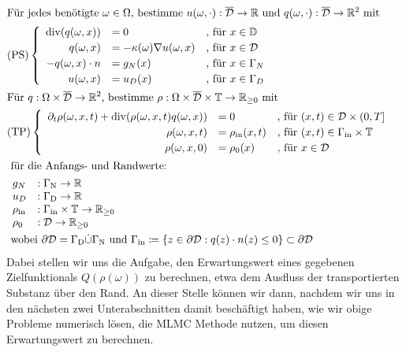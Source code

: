 \begin{align*}
\setlength\arraycolsep{1pt}
&\text{Für jedes benötigte } \omega \in \Omega \text{, bestimme } u(\omega,\cdot):\overline{\mathcal{D}} \to \R \text{ und } q(\omega, \cdot): \overline{\mathcal{D}} \to \R^2 \text{ mit } \\
&\text{(PS)}
	\begin{cases}
		\begin{array}{rlll}
		\dive (q(\omega,x)) &= 0  &\text{, für } x \in \mathbb{ D}\\  
		q(\omega,x) &= - \kappa(\omega) \nabla u(\omega,x)  &\text{, für } x \in \mathcal{D}\\
		-q(\omega,x) \cdot n &= g_N(x)  &\text{, für } x \in \Gamma_N \\
		u(\omega,x) &= u_D(x)  &\text{, für } x \in \Gamma_D \\
		\end{array}
	\end{cases} \\
&\text{Für } q: \Omega \times \overline{\mathcal{D}} \to \R^2 \text{, bestimme }\rho: \Omega \times \overline{\mathcal{D}} \times \mathbb{T} \to \R_{\geq 0} \text{ mit} \\
&\text{(TP)} 
	\begin{cases}
		\begin{array}{rlll}
			\partial_t \rho (\omega, x, t) + \dive(\rho(\omega,x,t)q(\omega,x)) &= 0 &\text{, für } (x,t) \in \mathcal{D} \times (0,T] \\
			\rho(\omega,x,t) &= \rho_{\text{in}}(x,t) &\text{, für } (x,t) \in \Gamma_{\text{in}} \times \mathbb{T} \\
			\rho(\omega,x,0)  &= \rho_0(x) &\text{, für } x \in  \mathcal{D}
		\end{array}
	\end{cases} \\
&\text{ für die Anfangs- und Randwerte: } \\ 
	&\begin{array}{llr}
		g_N&: \Gamma_{\text{N}} \to \R \\
		u_D&: \Gamma_{\text{D}} \to \R \\
	    \rho_{\text{in}}&: \Gamma_{\text{in}} \times \mathbb{T} \to \R_{\geq0} \\
		\rho_0&: \mathcal{D} \to \R_{\geq0} \\
	\end{array} \newline \\
&\text{ wobei } \partial \mathcal{D} = \Gamma_{\text{D}} \dot{\cup} \Gamma_{\text{N}}  \text{ und }  \Gamma_{\text{in}} \coloneqq  \{ z \in \partial \mathcal{D}: q(z)\cdot n(z) \leq 0 \} \subset  \partial \mathcal{D}
\end{align*}
Dabei stellen wir uns die Aufgabe, den Erwartungswert eines gegebenen Zielfunktionals $Q(\rho(\omega))$ zu berechnen, etwa dem Ausfluss der transportierten Substanz über den Rand. An dieser Stelle können wir dann, nachdem wir uns in den nächsten zwei Unterabschnitten damit beschäftigt haben, wie wir obige Probleme numerisch lösen, die MLMC Methode nutzen, um diesen Erwartungswert zu berechnen. 
